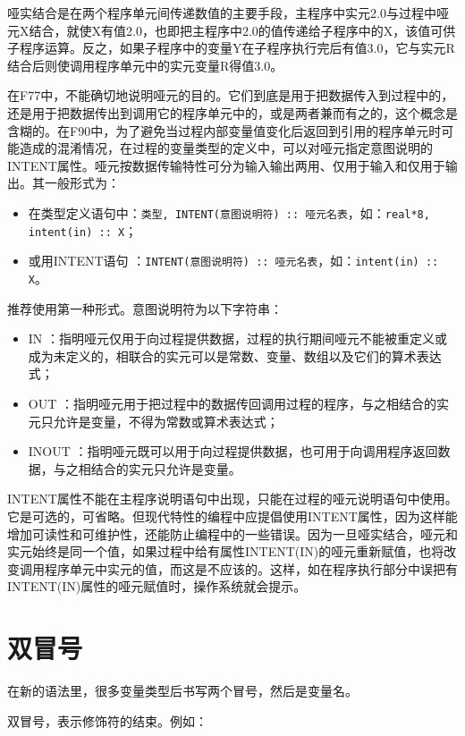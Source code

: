 哑实结合是在两个程序单元间传递数值的主要手段，主程序中实元2.0与过程中哑元X结合，就使X有值2.0，也即把主程序中2.0的值传递给子程序中的X，该值可供子程序运算。反之，如果子程序中的变量Y在子程序执行完后有值3.0，它与实元R结合后则使调用程序单元中的实元变量R得值3.0。

在F77中，不能确切地说明哑元的目的。它们到底是用于把数据传入到过程中的，还是用于把数据传出到调用它的程序单元中的，或是两者兼而有之的，这个概念是含糊的。在F90中，为了避免当过程内部变量值变化后返回到引用的程序单元时可能造成的混淆情况，在过程的变量类型的定义中，可以对哑元指定意图说明的INTENT属性。哑元按数据传输特性可分为输入输出两用、仅用于输入和仅用于输出。其一般形式为：
\begin{itemize}
\item 在类型定义语句中：\verb|类型, INTENT(意图说明符) :: 哑元名表|，如：\verb|real*8, intent(in) :: X|；
\item 或用INTENT语句 ：\verb|INTENT(意图说明符) :: 哑元名表|，如：\verb|intent(in) :: X|。
\end{itemize}
推荐使用第一种形式。意图说明符为以下字符串：
\begin{itemize}
\item IN ：指明哑元仅用于向过程提供数据，过程的执行期间哑元不能被重定义或成为未定义的，相联合的实元可以是常数、变量、数组以及它们的算术表达式；

\item OUT ：指明哑元用于把过程中的数据传回调用过程的程序，与之相结合的实元只允许是变量，不得为常数或算术表达式；

\item INOUT ：指明哑元既可以用于向过程提供数据，也可用于向调用程序返回数据，与之相结合的实元只允许是变量。
\end{itemize}

INTENT属性不能在主程序说明语句中出现，只能在过程的哑元说明语句中使用。它是可选的，可省略。但现代特性的编程中应提倡使用INTENT属性，因为这样能增加可读性和可维护性，还能防止编程中的一些错误。因为一旦哑实结合，哑元和实元始终是同一个值，如果过程中给有属性INTENT(IN)的哑元重新赋值，也将改变调用程序单元中实元的值，而这是不应该的。这样，如在程序执行部分中误把有INTENT(IN)属性的哑元赋值时，操作系统就会提示。


\section{双冒号}
在新的语法里，很多变量类型后书写两个冒号，然后是变量名。

双冒号，表示修饰符的结束。例如：

